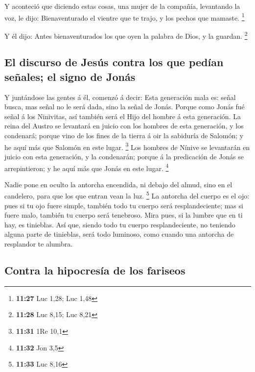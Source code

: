  Y aconteció que diciendo estas cosas, una mujer de la
compañía, levantando la voz, le dijo: Bienaventurado el vientre que te
trajo, y los pechos que mamaste. \footnote{\textbf{11:27} Luc 1,28; Luc
  1,48}

 Y él dijo: Antes bienaventurados los que oyen la palabra
de Dios, y la guardan. \footnote{\textbf{11:28} Luc 8,15; Luc 8,21}

\hypertarget{el-discurso-de-jesuxfas-contra-los-que-peduxedan-seuxf1ales-el-signo-de-jonuxe1s}{%
\subsection{El discurso de Jesús contra los que pedían señales; el signo
de
Jonás}\label{el-discurso-de-jesuxfas-contra-los-que-peduxedan-seuxf1ales-el-signo-de-jonuxe1s}}

 Y juntándose las gentes á él, comenzó á decir: Esta
generación mala es: señal busca, mas señal no le será dada, sino la
señal de Jonás.  Porque como Jonás fué señal á los
Ninivitas, así también será el Hijo del hombre á esta generación.
 La reina del Austro se levantará en juicio con los
hombres de esta generación, y los condenará; porque vino de los fines de
la tierra á oir la sabiduría de Salomón; y he aquí más que Salomón en
este lugar. \footnote{\textbf{11:31} 1Re 10,1}  Los
hombres de Nínive se levantarán en juicio con esta generación, y la
condenarán; porque á la predicación de Jonás se arrepintieron; y he aquí
más que Jonás en este lugar. \footnote{\textbf{11:32} Jon 3,5}

 Nadie pone en oculto la antorcha encendida, ni debajo
del almud, sino en el candelero, para que los que entran vean la luz.
\footnote{\textbf{11:33} Luc 8,16}  La antorcha del
cuerpo es el ojo: pues si tu ojo fuere simple, también todo tu cuerpo
será resplandeciente; mas si fuere malo, también tu cuerpo será
tenebroso.  Mira pues, si la lumbre que en ti hay, es
tinieblas.  Así que, siendo todo tu cuerpo
resplandeciente, no teniendo alguna parte de tinieblas, será todo
luminoso, como cuando una antorcha de resplandor te alumbra.

\hypertarget{contra-la-hipocresuxeda-de-los-fariseos}{%
\subsection{Contra la hipocresía de los
fariseos}\label{contra-la-hipocresuxeda-de-los-fariseos}}

